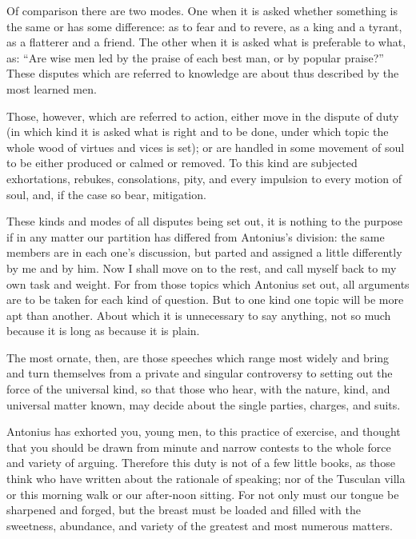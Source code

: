  Of comparison there are two modes. One when it is asked whether something is the same or has some difference: as to fear and to revere, as a king and a tyrant, as a flatterer and a friend. The other when it is asked what is preferable to what, as: ``Are wise men led by the praise of each best man, or by popular praise?'' These disputes which are referred to knowledge are about thus described by the most learned men.

 Those, however, which are referred to action, either move in the dispute of duty (in which kind it is asked what is right and to be done, under which topic the whole wood of virtues and vices is set); or are handled in some movement of soul to be either produced or calmed or removed. To this kind are subjected exhortations, rebukes, consolations, pity, and every impulsion to every motion of soul, and, if the case so bear, mitigation.

 These kinds and modes of all disputes being set out, it is nothing to the purpose if in any matter our partition has differed from Antonius's division: the same members are in each one's discussion, but parted and assigned a little differently by me and by him. Now I shall move on to the rest, and call myself back to my own task and weight. For from those topics which Antonius set out, all arguments are to be taken for each kind of question. But to one kind one topic will be more apt than another. About which it is unnecessary to say anything, not so much because it is long as because it is plain.

 The most ornate, then, are those speeches which range most widely and bring and turn themselves from a private and singular controversy to setting out the force of the universal kind, so that those who hear, with the nature, kind, and universal matter known, may decide about the single parties, charges, and suits.

 Antonius has exhorted you, young men, to this practice of exercise, and thought that you should be drawn from minute and narrow contests to the whole force and variety of arguing. Therefore this duty is not of a few little books, as those think who have written about the rationale of speaking; nor of the Tusculan villa or this morning walk or our after-noon sitting. For not only must our tongue be sharpened and forged, but the breast must be loaded and filled with the sweetness, abundance, and variety of the greatest and most numerous matters.

